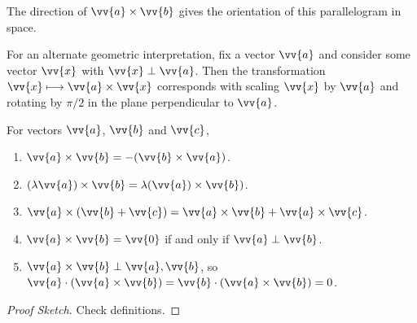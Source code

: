   \begin{center}
  \end{center}

  The direction of $\vv{a} \times \vv{b}$ gives the orientation of this parallelogram in space.   

For an alternate geometric interpretation, fix a vector $\vv{a}$ and consider some vector $\vv{x}$ with $\vv{x} \perp \vv{a}$. Then the transformation $\vv{x} \longmapsto \vv{a} \times \vv{x}$ corresponds with scaling $\vv{x}$ by $\vv{a}$ and rotating by $\pi/2$ in the plane perpendicular to $\vv{a}$.

\begin{proposition}
    For vectors $\vv{a}$, $\vv{b}$ and $\vv{c}$,
    \begin{enumerate}[label=(\roman*)]
        \item $\vv{a} \times \vv{b} = - (\vv{b} \times \vv{a})$.
        \item $(\lambda \vv{a}) \times \vv{b} = \lambda (\vv{a}) \times \vv{b})$.
        \item $\vv{a} \times (\vv{b} + \vv{c}) = \vv{a} \times \vv{b} + \vv{a} \times \vv{c}$.
        \item $\vv{a} \times \vv{b} = \vv{0}$ if and only if $\vv{a} \perp \vv{b}$.
        \item $\vv{a} \times \vv{b} \perp \vv{a}, \vv{b}$, so $\vv{a} \cdot (\vv{a} \times \vv{b}) = \vv{b} \cdot (\vv{a} \times \vv{b}) = 0$. 
    \end{enumerate}
\end{proposition}
\begin{proof}[Proof Sketch]
    Check definitions.
\end{proof}

